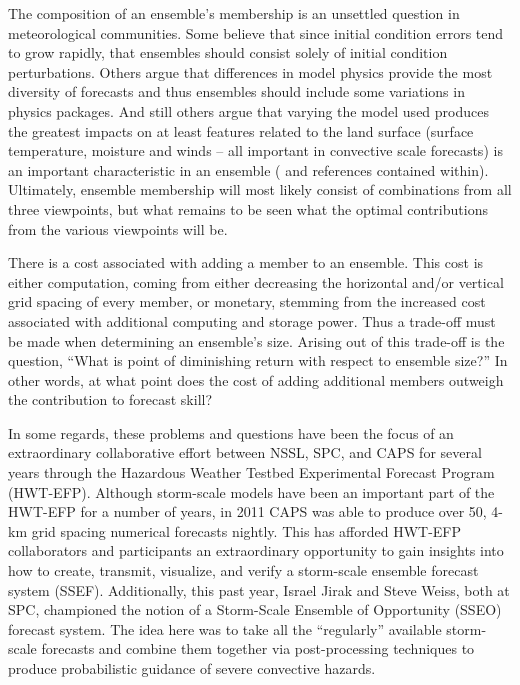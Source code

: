 The composition of an ensemble's membership is an unsettled question in meteorological communities. Some believe that since initial condition errors tend to grow rapidly, that ensembles should consist solely of initial condition perturbations. Others argue that differences in model physics provide the most diversity of forecasts and thus ensembles should include some variations in physics packages. And still others argue that varying the model used produces the greatest impacts on at least features related to the land surface (surface temperature, moisture and winds -- all important in convective scale forecasts) is an important characteristic in an ensemble (\citealp{stensrud2000epscreation, eckel2005ensemble} and references contained within).  Ultimately, ensemble membership will most likely consist of combinations from all three viewpoints, but what remains to be seen what the optimal contributions from the various viewpoints will be.


There is a cost associated with adding a member to an ensemble. This cost is either computation, coming from either decreasing the horizontal and/or vertical grid spacing of every member, or monetary, stemming from the increased cost associated with additional computing and storage power. Thus a trade-off must be made when determining an ensemble's size. Arising out of this trade-off is the question, ``What is point of diminishing return with respect to ensemble size?'' In other words, at what point does the cost of adding additional members outweigh the contribution to forecast skill?


In some regards, these problems and questions have been the focus of an extraordinary collaborative effort between NSSL, SPC, and CAPS for several years through the Hazardous Weather Testbed Experimental Forecast Program (HWT-EFP). Although storm-scale models have been an important part of the HWT-EFP for a number of years, in 2011 CAPS was able to produce over 50, 4-km grid spacing numerical forecasts nightly. This has afforded HWT-EFP collaborators and participants an extraordinary opportunity to gain insights into how to create, transmit, visualize, and verify a storm-scale ensemble forecast system (SSEF). Additionally, this past year, Israel Jirak and Steve Weiss, both at SPC, championed the notion of a Storm-Scale Ensemble of Opportunity (SSEO) forecast system. The idea here was to take all the ``regularly'' available storm-scale forecasts and combine them together via post-processing techniques to produce probabilistic guidance of severe convective hazards.


